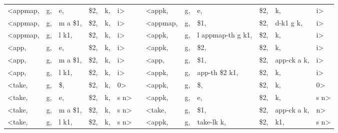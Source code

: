 \documentclass[12pt]{article} %
\begin{document}
\begin{center}
\begin{tabular}{llllllcllllll}
<appmap, & g, & e, & \$2, & k, & i> & & <appk, & g, & e, & \$2, & k, & i>\\
<appmap, & g, & m a \$1, & \$2, & k, & i> & & <appmap, & g, & \$1, & \$2, & d-k1 g k, & i>\\
<appmap, & g, & l k1, & \$2, & k, & i> & & <appk, & g, & l appmap-th g k1, & \$2, & k, & i>\\
<app, & g, & e, & \$2, & k, & i> & & <appk, & g, & \$2, & \$2, & k, & i>\\
<app, & g, & m a \$1, & \$2, & k, & i> & & <app, & g, & \$1, & \$2, & app-ck a k, & i>\\
<app, & g, & l k1, & \$2, & k, & i> & & <appk, & g, & app-th \$2 k1, & \$2, & k, & i>\\
<take, & g, & \$, & \$2, & k, & 0> & & <appk, & g, & \$, & \$2, & k, & 0>\\
<take, & g, & e, & \$2, & k, & s n> & & <appk, & g, & e, & \$2, & k, & s n>\\
<take, & g, & m a \$1, & \$2, & k, & s n> & & <take, & g, & \$1, & \$2, & app-ck a k, & n>\\
<take, & g, & l k1, & \$2, & k, & s n> & & <appk, & g, & take-lk k, & \$2, & k1, & s n>\\
\end{tabular}
\end{center}
\end{document}
